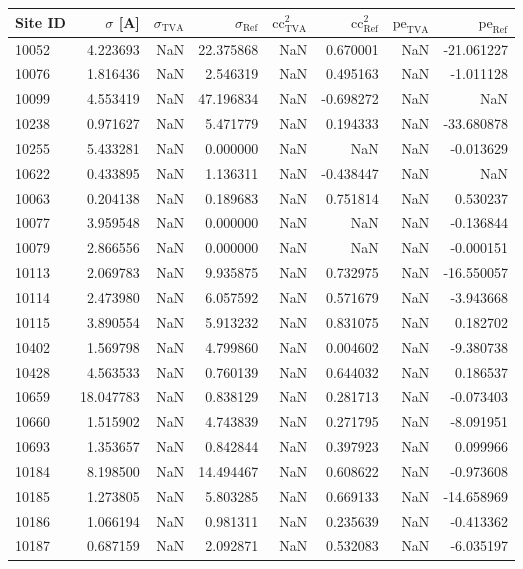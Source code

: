 \begin{tabular}{lrrrrrrr}
\toprule
Site ID & $\sigma$ [A] & $\sigma_\text{TVA}$ & $\sigma_\text{Ref}$ & $\text{cc}^2_\text{TVA}$ & $\text{cc}^2_\text{Ref}$ & $\text{pe}_\text{TVA}$ & $\text{pe}_\text{Ref}$ \\
\midrule
10052 & 4.223693 & NaN & 22.375868 & NaN & 0.670001 & NaN & -21.061227 \\
10076 & 1.816436 & NaN & 2.546319 & NaN & 0.495163 & NaN & -1.011128 \\
10099 & 4.553419 & NaN & 47.196834 & NaN & -0.698272 & NaN & NaN \\
10238 & 0.971627 & NaN & 5.471779 & NaN & 0.194333 & NaN & -33.680878 \\
10255 & 5.433281 & NaN & 0.000000 & NaN & NaN & NaN & -0.013629 \\
10622 & 0.433895 & NaN & 1.136311 & NaN & -0.438447 & NaN & NaN \\
10063 & 0.204138 & NaN & 0.189683 & NaN & 0.751814 & NaN & 0.530237 \\
10077 & 3.959548 & NaN & 0.000000 & NaN & NaN & NaN & -0.136844 \\
10079 & 2.866556 & NaN & 0.000000 & NaN & NaN & NaN & -0.000151 \\
10113 & 2.069783 & NaN & 9.935875 & NaN & 0.732975 & NaN & -16.550057 \\
10114 & 2.473980 & NaN & 6.057592 & NaN & 0.571679 & NaN & -3.943668 \\
10115 & 3.890554 & NaN & 5.913232 & NaN & 0.831075 & NaN & 0.182702 \\
10402 & 1.569798 & NaN & 4.799860 & NaN & 0.004602 & NaN & -9.380738 \\
10428 & 4.563533 & NaN & 0.760139 & NaN & 0.644032 & NaN & 0.186537 \\
10659 & 18.047783 & NaN & 0.838129 & NaN & 0.281713 & NaN & -0.073403 \\
10660 & 1.515902 & NaN & 4.743839 & NaN & 0.271795 & NaN & -8.091951 \\
10693 & 1.353657 & NaN & 0.842844 & NaN & 0.397923 & NaN & 0.099966 \\
10184 & 8.198500 & NaN & 14.494467 & NaN & 0.608622 & NaN & -0.973608 \\
10185 & 1.273805 & NaN & 5.803285 & NaN & 0.669133 & NaN & -14.658969 \\
10186 & 1.066194 & NaN & 0.981311 & NaN & 0.235639 & NaN & -0.413362 \\
10187 & 0.687159 & NaN & 2.092871 & NaN & 0.532083 & NaN & -6.035197 \\

\end{tabular}
